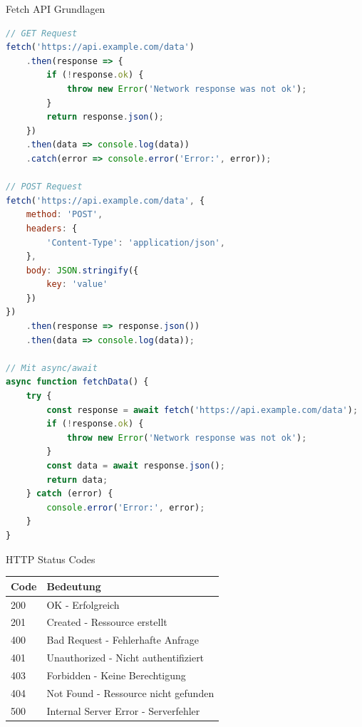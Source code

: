\begin{KR}{Fetch API Grundlagen}
\begin{lstlisting}[language=JavaScript, style=basesmol]
// GET Request
fetch('https://api.example.com/data')
    .then(response => {
        if (!response.ok) {
            throw new Error('Network response was not ok');
        }
        return response.json();
    })
    .then(data => console.log(data))
    .catch(error => console.error('Error:', error));

// POST Request
fetch('https://api.example.com/data', {
    method: 'POST',
    headers: {
        'Content-Type': 'application/json',
    },
    body: JSON.stringify({
        key: 'value'
    })
})
    .then(response => response.json())
    .then(data => console.log(data));

// Mit async/await
async function fetchData() {
    try {
        const response = await fetch('https://api.example.com/data');
        if (!response.ok) {
            throw new Error('Network response was not ok');
        }
        const data = await response.json();
        return data;
    } catch (error) {
        console.error('Error:', error);
    }
}
\end{lstlisting}
\end{KR}

\begin{theorem}{HTTP Status Codes}
    \begin{center}
    \begin{tabular}{|l|l|}
    \hline
    Code & Bedeutung \\
    \hline
    200 & OK - Erfolgreich \\
    \hline
    201 & Created - Ressource erstellt \\
    \hline
    400 & Bad Request - Fehlerhafte Anfrage \\
    \hline
    401 & Unauthorized - Nicht authentifiziert \\
    \hline
    403 & Forbidden - Keine Berechtigung \\
    \hline
    404 & Not Found - Ressource nicht gefunden \\
    \hline
    500 & Internal Server Error - Serverfehler \\
    \hline
    \end{tabular}
    \end{center}
\end{theorem}

